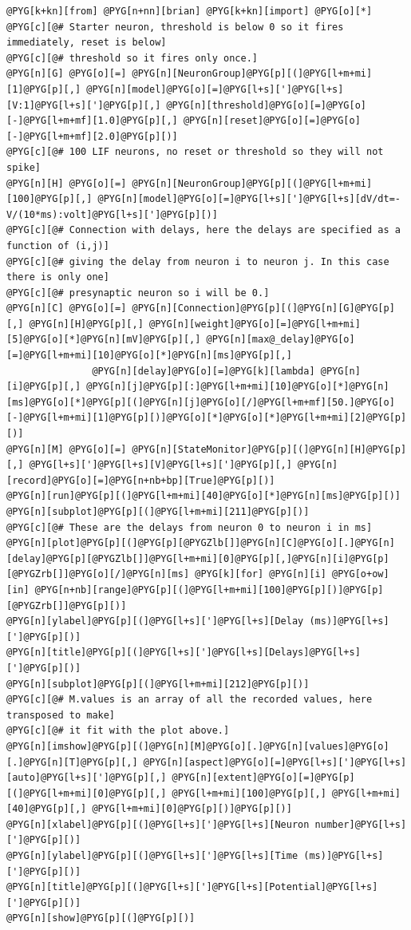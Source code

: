 \documentclass[letterpaper,10pt,english]{manual}
\begin{document}
\begin{Verbatim}[commandchars=@\[\]]
@PYG[k+kn][from] @PYG[n+nn][brian] @PYG[k+kn][import] @PYG[o][*]
@PYG[c][@# Starter neuron, threshold is below 0 so it fires immediately, reset is below]
@PYG[c][@# threshold so it fires only once.]
@PYG[n][G] @PYG[o][=] @PYG[n][NeuronGroup]@PYG[p][(]@PYG[l+m+mi][1]@PYG[p][,] @PYG[n][model]@PYG[o][=]@PYG[l+s][']@PYG[l+s][V:1]@PYG[l+s][']@PYG[p][,] @PYG[n][threshold]@PYG[o][=]@PYG[o][-]@PYG[l+m+mf][1.0]@PYG[p][,] @PYG[n][reset]@PYG[o][=]@PYG[o][-]@PYG[l+m+mf][2.0]@PYG[p][)]
@PYG[c][@# 100 LIF neurons, no reset or threshold so they will not spike]
@PYG[n][H] @PYG[o][=] @PYG[n][NeuronGroup]@PYG[p][(]@PYG[l+m+mi][100]@PYG[p][,] @PYG[n][model]@PYG[o][=]@PYG[l+s][']@PYG[l+s][dV/dt=-V/(10*ms):volt]@PYG[l+s][']@PYG[p][)]
@PYG[c][@# Connection with delays, here the delays are specified as a function of (i,j)]
@PYG[c][@# giving the delay from neuron i to neuron j. In this case there is only one]
@PYG[c][@# presynaptic neuron so i will be 0.]
@PYG[n][C] @PYG[o][=] @PYG[n][Connection]@PYG[p][(]@PYG[n][G]@PYG[p][,] @PYG[n][H]@PYG[p][,] @PYG[n][weight]@PYG[o][=]@PYG[l+m+mi][5]@PYG[o][*]@PYG[n][mV]@PYG[p][,] @PYG[n][max@_delay]@PYG[o][=]@PYG[l+m+mi][10]@PYG[o][*]@PYG[n][ms]@PYG[p][,]
               @PYG[n][delay]@PYG[o][=]@PYG[k][lambda] @PYG[n][i]@PYG[p][,] @PYG[n][j]@PYG[p][:]@PYG[l+m+mi][10]@PYG[o][*]@PYG[n][ms]@PYG[o][*]@PYG[p][(]@PYG[n][j]@PYG[o][/]@PYG[l+m+mf][50.]@PYG[o][-]@PYG[l+m+mi][1]@PYG[p][)]@PYG[o][*]@PYG[o][*]@PYG[l+m+mi][2]@PYG[p][)]
@PYG[n][M] @PYG[o][=] @PYG[n][StateMonitor]@PYG[p][(]@PYG[n][H]@PYG[p][,] @PYG[l+s][']@PYG[l+s][V]@PYG[l+s][']@PYG[p][,] @PYG[n][record]@PYG[o][=]@PYG[n+nb+bp][True]@PYG[p][)]
@PYG[n][run]@PYG[p][(]@PYG[l+m+mi][40]@PYG[o][*]@PYG[n][ms]@PYG[p][)]
@PYG[n][subplot]@PYG[p][(]@PYG[l+m+mi][211]@PYG[p][)]
@PYG[c][@# These are the delays from neuron 0 to neuron i in ms]
@PYG[n][plot]@PYG[p][(]@PYG[p][@PYGZlb[]]@PYG[n][C]@PYG[o][.]@PYG[n][delay]@PYG[p][@PYGZlb[]]@PYG[l+m+mi][0]@PYG[p][,]@PYG[n][i]@PYG[p][@PYGZrb[]]@PYG[o][/]@PYG[n][ms] @PYG[k][for] @PYG[n][i] @PYG[o+ow][in] @PYG[n+nb][range]@PYG[p][(]@PYG[l+m+mi][100]@PYG[p][)]@PYG[p][@PYGZrb[]]@PYG[p][)]
@PYG[n][ylabel]@PYG[p][(]@PYG[l+s][']@PYG[l+s][Delay (ms)]@PYG[l+s][']@PYG[p][)]
@PYG[n][title]@PYG[p][(]@PYG[l+s][']@PYG[l+s][Delays]@PYG[l+s][']@PYG[p][)]
@PYG[n][subplot]@PYG[p][(]@PYG[l+m+mi][212]@PYG[p][)]
@PYG[c][@# M.values is an array of all the recorded values, here transposed to make]
@PYG[c][@# it fit with the plot above.]
@PYG[n][imshow]@PYG[p][(]@PYG[n][M]@PYG[o][.]@PYG[n][values]@PYG[o][.]@PYG[n][T]@PYG[p][,] @PYG[n][aspect]@PYG[o][=]@PYG[l+s][']@PYG[l+s][auto]@PYG[l+s][']@PYG[p][,] @PYG[n][extent]@PYG[o][=]@PYG[p][(]@PYG[l+m+mi][0]@PYG[p][,] @PYG[l+m+mi][100]@PYG[p][,] @PYG[l+m+mi][40]@PYG[p][,] @PYG[l+m+mi][0]@PYG[p][)]@PYG[p][)]
@PYG[n][xlabel]@PYG[p][(]@PYG[l+s][']@PYG[l+s][Neuron number]@PYG[l+s][']@PYG[p][)]
@PYG[n][ylabel]@PYG[p][(]@PYG[l+s][']@PYG[l+s][Time (ms)]@PYG[l+s][']@PYG[p][)]
@PYG[n][title]@PYG[p][(]@PYG[l+s][']@PYG[l+s][Potential]@PYG[l+s][']@PYG[p][)]
@PYG[n][show]@PYG[p][(]@PYG[p][)]
\end{Verbatim}
\end{document}
